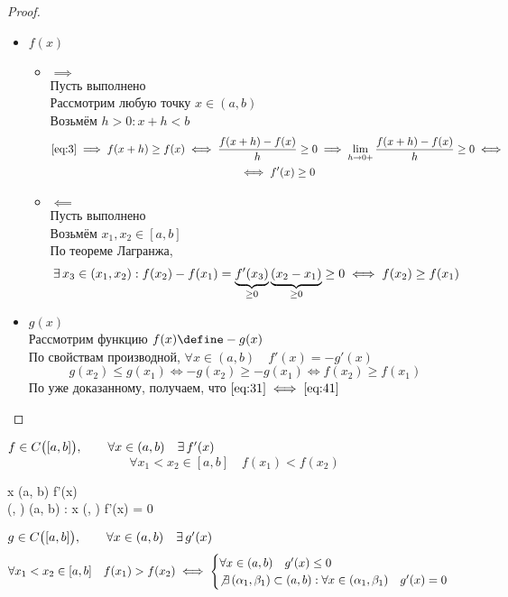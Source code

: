 \begin{proof}
	\hfill
    \begin{itemize}
    	\item $f(x)$
        \begin{itemize}
        	\item $\implies$ \\
            Пусть выполнено  \\
            Рассмотрим любую точку $x \in (a, b) $ \\
            Возьмём $h > 0 : x + h < b $
            \begin{multline*}
                \eref3 \implies f(x + h) \ge f(x) \iff \frac{f(x + h) - f(x)}h \ge 0 \implies \liml{h \to 0+} \frac{f(x + h) - f(x)}h \ge 0 \iff \\ \iff f'(x) \ge 0
            \end{multline*}
            \item $\impliedby$ \\
            Пусть выполнено  \\
            Возьмём $ x_1, x_2 \in [a, b] $ \\
            По теореме Лагранжа,
            $$ \exists\, x_3 \in (x_1, x_2) : f(x_2) - f(x_1) = \underbrace{f'(x_3)}_{\ge 0}\underbrace{(x_2 - x_1)}_{\ge 0} \ge 0 \iff f(x_2) \ge f(x_1) $$
        \end{itemize}
        \item $g(x)$ \\
        Рассмотрим функцию $f(x) \define -g(x)$ \\
        По свойствам производной, $ \forall x \in (a, b) \quad f'(x) = -g'(x) $
        $$ g(x_2) \le g(x_1) \iff -g(x_2) \ge -g(x_1) \iff f(x_2) \ge f(x_1) $$
        По уже доказанному, получаем, что $\eref{31} \iff \eref{41} $
    \end{itemize}
\end{proof}

\begin{theorem}
	$ f \in C \big( [a, b] \big), \qquad \forall x \in (a, b) \quad \exists\, f'(x) $
    $$ \forall x_1 < x_2 \in [a, b] \quad f(x_1) < f(x_2) $$
    \begin{mequ}[\iff \empheqlbrace]
         \forall x \in (a, b) \quad f'(x)  \\
         \not\exist (\alpha, \beta) \sub (a, b) : \forall x \in (\alpha, \beta) \quad f'(x) = 0
    \end{mequ}
    $ g \in C \big( [a, b] \big), \qquad \forall x \in (a, b) \quad \exists\, g'(x) $
    $$ \forall x_1 < x_2 \in [a, b] \quad f(x_1) > f(x_2) \iff
    \begin{cases}
        \forall x \in (a, b) \quad g'(x) \le 0 \\
        \not\exists\, (\alpha_1, \beta_1) \subset (a, b) : \forall x \in (\alpha_1, \beta_1) \quad g'(x) = 0
    \end{cases} $$
\end{theorem}

